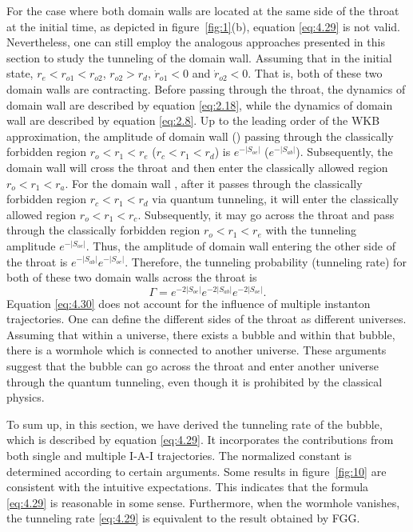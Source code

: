 \documentclass[12pt]{article}
\begin{document}
For the case where both domain walls are located at the same side of the throat at the initial time, as depicted in figure~\ref{fig:1}(b), equation \eqref{eq:4.29} is not valid. Nevertheless, one can still  employ the analogous approaches presented in this section to study the tunneling of the domain wall. Assuming that in the initial state, $r_{e}<r_{o1}<r_{o2}$, $r_{o2}>r_{d}$, $\dot{r}_{o1}<0$ and $\dot{r}_{o2}<0$. That is, both of these two domain walls are contracting. Before passing through the throat, the dynamics of domain wall \uppercase\expandafter{} are described by equation \eqref{eq:2.18}, while the dynamics of domain wall \uppercase\expandafter{} are described by equation \eqref{eq:2.8}. Up to the leading order of the WKB approximation, the amplitude of domain wall \uppercase\expandafter{} (\uppercase\expandafter{}) passing through the classically forbidden region $r_{o}<r_{1}<r_{e}$ ($r_{c}<r_{1}<r_{d}$) is $e^{-|S_{oe}|}$ ($e^{-|S_{ab}|}$). Subsequently, the domain wall \uppercase\expandafter{} will cross the throat and then enter the classically allowed region $r_{o}<r_{1}<r_{a}$. For the domain wall \uppercase\expandafter{}, after it passes through the classically forbidden region $r_{c}<r_{1}<r_{d}$ via quantum tunneling, it will enter the classically allowed region $r_{o}<r_{1}<r_{c}$. Subsequently, it may go across the throat and pass through the classically forbidden region $r_{o}<r_{1}<r_{e}$ with the tunneling amplitude $e^{-|S_{oe}|}$. Thus, the amplitude of domain wall \uppercase\expandafter{} entering the other side of the throat is  $e^{-|S_{ab}|}e^{-|S_{oe}|}$. Therefore, the tunneling probability (tunneling rate) for both of these two domain walls across the throat is
\begin{equation}
\label{eq:4.30}%
\Gamma=e^{-2|S_{oe}|}e^{-2|S_{ab}|}e^{-2|S_{oe}|}.
\end{equation}
Equation \eqref{eq:4.30} does not account for the influence of multiple instanton trajectories.  One can define the different sides of the throat as different universes. Assuming that within a universe, there exists a bubble and within that bubble, there is a wormhole which is connected to another universe. These arguments suggest that the bubble can go across the throat and enter another universe through the quantum tunneling, even though it is prohibited by the classical physics.



To sum up, in this section, we have derived the tunneling rate of the bubble, which is described by equation \eqref{eq:4.29}. It incorporates the contributions from both single and multiple I-A-I trajectories. The normalized constant is determined according to certain arguments. Some results in figure~\ref{fig:10} are consistent with the intuitive expectations. This indicates that the formula \eqref{eq:4.29} is reasonable in some sense. Furthermore, when the wormhole vanishes, the tunneling rate \eqref{eq:4.29} is equivalent to the result obtained by FGG.
\end{document}
